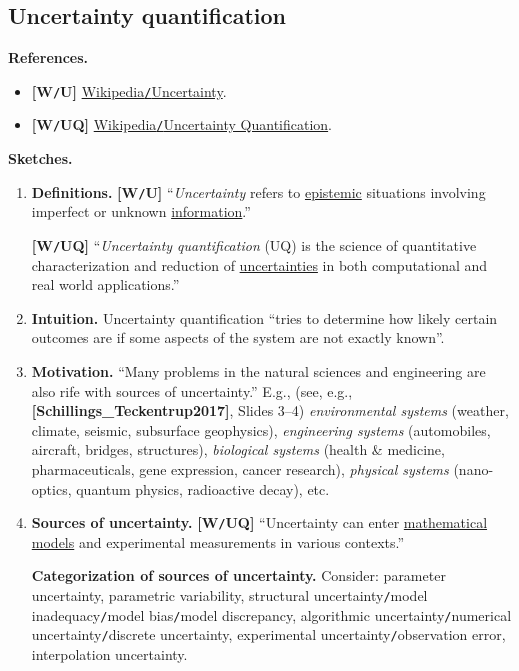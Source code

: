 \documentclass[oneside]{article}
\numberwithin{equation}{section}
\begin{document}
\subsection{Uncertainty quantification}
\textbf{References.}
\begin{itemize}
    \item \textbf{[W\texttt{/}U]} \href{https://en.wikipedia.org/wiki/Uncertainty}{Wikipedia\texttt{/}Uncertainty}.
    \item \textbf{[W\texttt{/}UQ]} \href{https://en.wikipedia.org/wiki/Uncertainty_quantification}{Wikipedia\texttt{/}Uncertainty Quantification}.
\end{itemize}
\textbf{Sketches.}
\begin{enumerate}
    \item \textbf{Definitions.} \textbf{[W\texttt{/}U]} ``\textit{Uncertainty} refers to \href{https://en.wikipedia.org/wiki/Epistemology}{epistemic} situations involving imperfect or unknown \href{https://en.wikipedia.org/wiki/Information}{information}.''
    
    \textbf{[W\texttt{/}UQ]} ``\textit{Uncertainty quantification} (UQ) is the science of quantitative characterization and reduction of \href{https://en.wikipedia.org/wiki/Uncertainty}{uncertainties} in both computational and real world applications.''
    \item \textbf{Intuition.} Uncertainty quantification ``tries to determine how likely certain outcomes are if some aspects of the system are not exactly known''.
    \item \textbf{Motivation.} ``Many problems in the natural sciences and engineering are also rife with sources of uncertainty.'' E.g., (see, e.g., \textbf{[Schillings\_Teckentrup2017]}, Slides 3--4) \textit{environmental systems} (weather, climate, seismic, subsurface geophysics), \textit{engineering systems} (automobiles, aircraft, bridges, structures), \textit{biological systems} (health \& medicine, pharmaceuticals, gene expression, cancer research), \textit{physical systems} (nano-optics, quantum physics, radioactive decay), etc.
    \item \textbf{Sources of uncertainty.} \textbf{[W\texttt{/}UQ]} ``Uncertainty can enter \href{https://en.wikipedia.org/wiki/Mathematical_model}{mathematical models} and experimental measurements in various contexts.''
    
    \textbf{Categorization of sources of uncertainty.} Consider: parameter uncertainty, parametric variability, structural uncertainty\texttt{/}model inadequacy\texttt{/}model bias\texttt{/}model discrepancy, algorithmic uncertainty\texttt{/}numerical uncertainty\texttt{/}discrete uncertainty, experimental uncertainty\texttt{/}observation error, interpolation uncertainty.
    

\end{enumerate}
\end{document}
